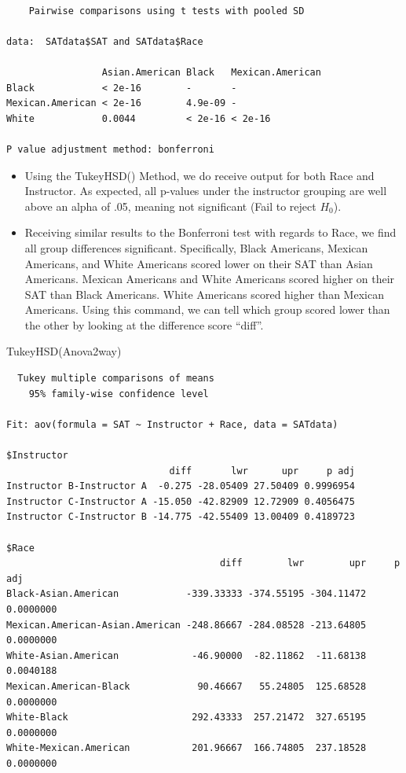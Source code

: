 \documentclass[
  letterpaper,
  DIV=11,
  numbers=noendperiod]{scrreprt}
\newenvironment{Shaded}{\begin{snugshade}}{\end{snugshade}}
\newcommand{\FunctionTok}[1]{\textcolor[rgb]{0.28,0.35,0.67}{#1}}
\newcommand{\NormalTok}[1]{\textcolor[rgb]{0.00,0.23,0.31}{#1}}
\providecommand{\tightlist}{%
  \setlength{\itemsep}{0pt}\setlength{\parskip}{0pt}}\usepackage{longtable,booktabs,array}
\begin{document}
\begin{verbatim}

    Pairwise comparisons using t tests with pooled SD 

data:  SATdata$SAT and SATdata$Race 

                 Asian.American Black   Mexican.American
Black            < 2e-16        -       -               
Mexican.American < 2e-16        4.9e-09 -               
White            0.0044         < 2e-16 < 2e-16         

P value adjustment method: bonferroni 
\end{verbatim}

\begin{itemize}
\tightlist
\item
  Using the TukeyHSD() Method, we do receive output for both Race and
  Instructor. As expected, all p-values under the instructor grouping
  are well above an alpha of .05, meaning not significant (Fail to
  reject \(H_0\)).
\item
  Receiving similar results to the Bonferroni test with regards to Race,
  we find all group differences significant. Specifically, Black
  Americans, Mexican Americans, and White Americans scored lower on
  their SAT than Asian Americans. Mexican Americans and White Americans
  scored higher on their SAT than Black Americans. White Americans
  scored higher than Mexican Americans. Using this command, we can tell
  which group scored lower than the other by looking at the difference
  score ``diff''.
\end{itemize}

\begin{Shaded}
\begin{Highlighting}[]
\FunctionTok{TukeyHSD}\NormalTok{(Anova2way)}
\end{Highlighting}
\end{Shaded}

\begin{verbatim}
  Tukey multiple comparisons of means
    95% family-wise confidence level

Fit: aov(formula = SAT ~ Instructor + Race, data = SATdata)

$Instructor
                             diff       lwr      upr     p adj
Instructor B-Instructor A  -0.275 -28.05409 27.50409 0.9996954
Instructor C-Instructor A -15.050 -42.82909 12.72909 0.4056475
Instructor C-Instructor B -14.775 -42.55409 13.00409 0.4189723

$Race
                                      diff        lwr        upr     p adj
Black-Asian.American            -339.33333 -374.55195 -304.11472 0.0000000
Mexican.American-Asian.American -248.86667 -284.08528 -213.64805 0.0000000
White-Asian.American             -46.90000  -82.11862  -11.68138 0.0040188
Mexican.American-Black            90.46667   55.24805  125.68528 0.0000000
White-Black                      292.43333  257.21472  327.65195 0.0000000
White-Mexican.American           201.96667  166.74805  237.18528 0.0000000
\end{verbatim}
\end{document}
